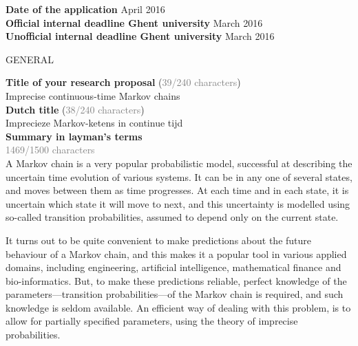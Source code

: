 \documentclass[11pt,dvipsnames,usenames,a4paper]{article}
\begin{document}
\newcommand{\todo}[1]{\textcolor{red}{\emph{#1}}}


{\bf Date of the application} \tab{} April 2016 \\
{\bf Official internal deadline Ghent university}  March 2016 \\
{\bf Unofficial internal deadline Ghent university}  March 2016 \\


\begin{shaded}\centering GENERAL \end{shaded}
\textbf{Title of your research proposal} (\textcolor{Gray}{39/240 characters})\\
Imprecise continuous-time Markov chains\\[8pt]
\textbf{Dutch title} (\textcolor{Gray}{38/240 characters})\\
Imprecieze Markov-ketens in continue tijd\\[8pt]
\textbf{Summary in layman's terms}\\
\textcolor{Gray}{1469/1500 characters}\\
A Markov chain is a very popular probabilistic model, successful at describing the uncertain time evolution of various systems. 
It can be in any one of several states, and moves between them as time progresses. 
At each time and in each state, it is uncertain which state it will move to next, and this uncertainty is modelled using so-called transition probabilities, assumed to depend only on the current state. 

It turns out to be quite convenient to make predictions about the future behaviour of a Markov chain, and this makes it a popular tool in various applied domains, including engineering, artificial intelligence, mathematical finance and bio-informatics. 
But, to make these predictions reliable, perfect knowledge of the parameters---transition probabilities---of the Markov chain is required, and such knowledge is seldom available. 
An efficient way of dealing with this problem, is to allow for partially specified parameters, using the theory of imprecise probabilities.
\end{document}
